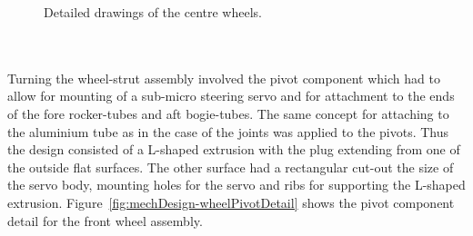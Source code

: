         \begin{figure}[h!]
        \centering
        \qquad
        \caption[Detailed drawings of the centre wheels.]{Detailed drawings of the centre wheels.}
        \label{fig:mechDesign-midWheelDetail}
        \end{figure}
      
      \newpage
      \\\\
        Turning the wheel-strut assembly involved the pivot component which had to allow for mounting of a sub-micro steering servo and for attachment to the ends of the fore rocker-tubes and aft bogie-tubes. The same concept for attaching to the aluminium tube as in the case of the joints was applied to the pivots. Thus the design consisted of a L-shaped extrusion with the plug extending from one of the outside flat surfaces. The other surface had a rectangular cut-out the size of the servo body, mounting holes for the servo and ribs for supporting the L-shaped extrusion. Figure~\ref{fig:mechDesign-wheelPivotDetail} shows the pivot component detail for the front wheel assembly.
        
